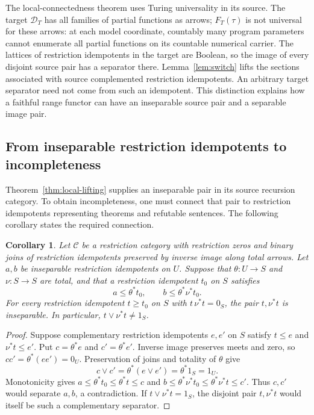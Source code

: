 \documentclass[11pt]{article}
\newtheorem{corollary}[theorem]{Corollary}
\begin{document}
The local-connectedness theorem uses Turing universality in its source.
The target $\mathcal D_T$ has all families of partial functions as arrows;
$F_T(\tau)$ is not universal for these arrows: at each model coordinate,
countably many program parameters cannot enumerate all partial functions
on its countable numerical carrier. The lattices of restriction
idempotents in the target are Boolean, so the image of every disjoint source pair has a separator
there. Lemma~\ref{lem:switch} lifts the sections associated with source
complemented restriction idempotents. An arbitrary target separator
need not come from such an idempotent. This distinction explains how a faithful range functor
can have an inseparable source pair and a separable image pair.

\subsection{From inseparable restriction idempotents to incompleteness}

Theorem~\ref{thm:local-lifting} supplies an inseparable pair in its
source recursion category. To obtain incompleteness, one must connect
that pair to restriction idempotents representing theorems and refutable sentences.
The following corollary states the required connection.

\begin{corollary}\label{cor:domain-incompleteness}
Let $\mathcal C$ be a restriction category with restriction zeros and
binary joins of restriction idempotents preserved by inverse image along total arrows.
Let $a,b$ be inseparable restriction idempotents on $U$. Suppose that
$\theta:U\to S$ and $\nu:S\to S$ are total, and that a restriction
idempotent $t_0$ on $S$ satisfies
\[
 a\le\theta^*t_0,\qquad b\le\theta^*\nu^*t_0.
\]
For every restriction idempotent $t\ge t_0$ on $S$ with $t\,\nu^*t=0_S$,
the pair $t,\nu^*t$ is inseparable. In particular,
$t\vee\nu^*t\ne1_S$.
\end{corollary}
\begin{proof}
Suppose complementary restriction idempotents $e,e'$ on $S$ satisfy
$t\le e$ and $\nu^*t\le e'$. Put
$c=\theta^*e$ and $c'=\theta^*e'$. Inverse image preserves
meets and zero, so $cc'=\theta^*(ee')=0_U$.
Preservation of joins and totality of $\theta$ give
\[
 c\vee c'=\theta^*(e\vee e')=\theta^*1_S=1_U.
\]
Monotonicity gives
$a\le\theta^*t_0\le\theta^*t\le c$ and
$b\le\theta^*\nu^*t_0\le\theta^*\nu^*t\le c'$.
Thus $c,c'$ would separate $a,b$, a contradiction.
If $t\vee\nu^*t=1_S$, the disjoint pair $t,\nu^*t$ would
itself be such a complementary separator.
\end{proof}
\end{document}
